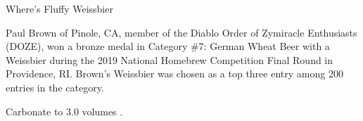 \stylesection{\styleweizenweissbier}

\begin{recipie}{Where's Fluffy Weissbier}

\begin{aboutblock}
Paul Brown of Pinole, CA, member of the Diablo Order of Zymiracle Enthusiasts (DOZE),
won a bronze medal in Category \#7: German Wheat Beer with a Weissbier during the 2019
National Homebrew Competition Final Round in Providence, RI. Brown's Weissbier was
chosen as a top three entry among 200 entries in the category.
\end{aboutblock}


\begin{methodandtiming}
 
\begin{mashsteps}
\end{mashsteps}

\begin{fermentationsteps}
\end{fermentationsteps}

\begin{directions}
Carbonate to 3.0 volumes .
\end{directions}

\end{methodandtiming}

\pagebreak

\begin{ingredientsblock}

\begin{malts}
\end{malts}

\begin{hops}
\end{hops}

\begin{yeasts}
\end{yeasts}

\end{ingredientsblock}

\end{recipie}
